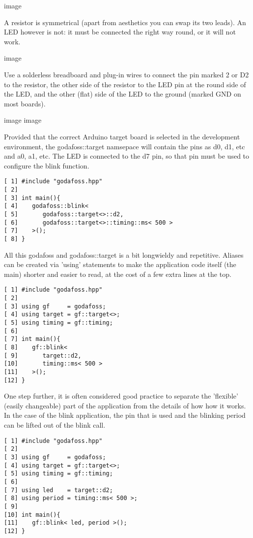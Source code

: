 \documentclass{article}
\begin{document}
image

A resistor is symmetrical (apart from aesthetics you can swap its two leads).
An LED however is not: it must be connected the right way round, 
or it will not work.

image

Use a solderless breadboard and plug-in wires to connect 
the pin marked 2 or D2 to the resistor, 
the other side of the resistor to the LED pin at the round side
of the LED, and the other (flat) side of the LED to the ground 
(marked GND on most boards).

image
image

Provided that the correct Arduino target board is selected in the 
development environment, the godafoss::target namsepace will contain
the pins as d0, d1, etc and a0, a1, etc.
The LED is connected to the d7 pin, so that pin must be used
to configure the blink function.

\lstset {language=C++}
\begin{lstlisting}
[ 1] #include "godafoss.hpp"
[ 2] 
[ 3] int main(){
[ 4]    godafoss::blink< 
[ 5]       godafoss::target<>::d2, 
[ 6]       godafoss::target<>::timing::ms< 500 > 
[ 7]    >();
[ 8] }
\end{lstlisting}

All this godafoss and godafoss::target is a bit longwieldy and repetitive.
Aliases can be created via 'using' statements to make the application 
code itself (the main) shorter and easier to read, at the cost of 
a few extra lines at the top.

\lstset {language=C++}
\begin{lstlisting}
[ 1] #include "godafoss.hpp"
[ 2] 
[ 3] using gf     = godafoss;
[ 4] using target = gf::target<>;
[ 5] using timing = gf::timing;
[ 6] 
[ 7] int main(){
[ 8]    gf::blink< 
[ 9]       target::d2, 
[10]       timing::ms< 500 > 
[11]    >();
[12] }
\end{lstlisting}

One step further, it is often considered good practice to separate
the 'flexible' (easily changeable) part of the application from 
the details of how how it works.
In the case of the blink application, the pin that is used and the
blinking period can be lifted out of the blink call.

\lstset {language=C++}
\begin{lstlisting}
[ 1] #include "godafoss.hpp"
[ 2] 
[ 3] using gf     = godafoss;
[ 4] using target = gf::target<>;
[ 5] using timing = gf::timing;
[ 6] 
[ 7] using led    = target::d2;
[ 8] using period = timing::ms< 500 >; 
[ 9] 
[10] int main(){
[11]    gf::blink< led, period >();
[12] }
\end{lstlisting}
\end{document}

